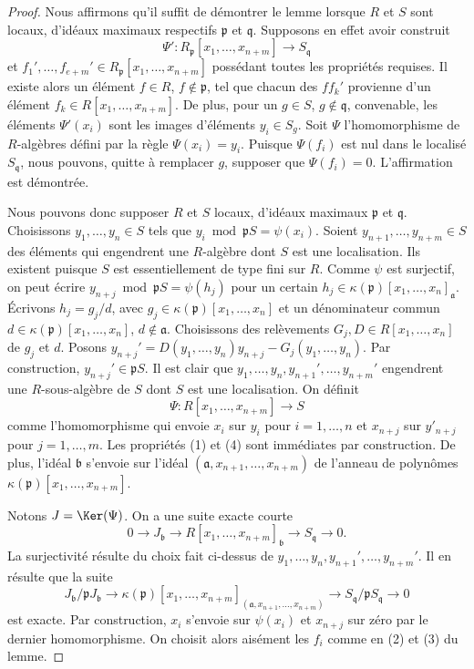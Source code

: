 \begin{proof}
Nous affirmons qu'il suffit de démontrer le lemme lorsque $R$
et $S$ sont locaux, d'idéaux maximaux respectifs $\mathfrak p$ et $\mathfrak q$.
Supposons en effet avoir construit
$$
\Psi' : R_{\mathfrak p}[x_1, \ldots, x_{n + m}]
\longrightarrow
S_{\mathfrak q}
$$
et $f_1', \ldots, f_{e + m}' \in R_{\mathfrak p}[x_1, \ldots, x_{n + m}]$
possédant toutes les propriétés requises. Il existe alors un élément
$f \in R$, $f \not \in \mathfrak p$, tel que chacun des
$ff_k'$ provienne d'un élément $f_k \in R[x_1, \ldots, x_{n + m}]$.
De plus, pour un $g \in S$, $g \not \in \mathfrak q$, convenable,
les éléments $\Psi'(x_i)$ sont les images d'éléments
$y_i \in S_g$. Soit $\Psi$ l'homomorphisme de $R$-algèbres défini
par la règle $\Psi(x_i) = y_i$. Puisque $\Psi(f_i)$ est nul
dans le localisé $S_{\mathfrak q}$, nous pouvons, quitte à remplacer
$g$, supposer que $\Psi(f_i) = 0$. L'affirmation est démontrée.

\medskip\noindent
Nous pouvons donc supposer $R$ et $S$ locaux,
d'idéaux maximaux $\mathfrak p$ et $\mathfrak q$.
Choisissons $y_1, \ldots, y_n \in S$ tels que
$y_i \bmod \mathfrak pS = \psi(x_i)$.
Soient $y_{n + 1}, \ldots, y_{n + m} \in S$ des éléments qui engendrent
une $R$-algèbre dont $S$ est une localisation.
Ils existent puisque $S$ est essentiellement de type fini sur $R$.
Comme $\psi$ est surjectif, on peut écrire
$y_{n + j} \bmod \mathfrak pS = \psi(h_j)$ pour
un certain $h_j \in \kappa(\mathfrak p)[x_1, \ldots, x_n]_{\mathfrak a}$.
Écrivons $h_j = g_j/d$, avec $g_j \in \kappa(\mathfrak p)[x_1, \ldots, x_n]$
et un dénominateur commun $d \in \kappa(\mathfrak p)[x_1, \ldots, x_n]$,
$d \not \in \mathfrak a$. Choisissons des relèvements
$G_j, D \in R[x_1, \ldots, x_n]$ de $g_j$ et $d$. Posons
$y_{n + j}' = D(y_1, \ldots, y_n) y_{n + j} - G_j(y_1, \ldots, y_n)$.
Par construction, $y_{n + j}' \in \mathfrak p S$.
Il est clair que $y_1, \ldots, y_n, y_{n + 1}', \ldots, y_{n + m}'$
engendrent une $R$-sous-algèbre de $S$ dont $S$ est une localisation.
On définit
$$
\Psi : R[x_1, \ldots, x_{n + m}] \to S
$$
comme l'homomorphisme qui envoie $x_i$ sur $y_i$ pour $i = 1, \ldots, n$
et $x_{n + j}$ sur $y'_{n + j}$ pour $j = 1, \ldots, m$. Les propriétés
(1) et (4) sont immédiates par construction. De plus, l'idéal
$\mathfrak b$ s'envoie sur l'idéal
$(\mathfrak a, x_{n + 1}, \ldots, x_{n + m})$
de l'anneau de polynômes $\kappa(\mathfrak p)[x_1, \ldots, x_{n + m}]$.

\medskip\noindent
Notons $J = \Ker(\Psi)$. On a une suite exacte courte
$$
0 \to J_{\mathfrak b}
\to R[x_1, \ldots, x_{n + m}]_{\mathfrak b}
\to S_{\mathfrak q}
\to 0.
$$
La surjectivité résulte du choix fait ci-dessus de
$y_1, \ldots, y_n, y_{n + 1}', \ldots, y_{n + m}'$.
Il en résulte que la suite
$$
J_{\mathfrak b}/ \mathfrak pJ_{\mathfrak b}
\to \kappa(\mathfrak p)[x_1, \ldots, x_{n + m}]_{
(\mathfrak a, x_{n + 1}, \ldots, x_{n + m})}
\to S_{\mathfrak q}/\mathfrak pS_{\mathfrak q}
\to 0
$$
est exacte. Par construction, $x_i$ s'envoie sur $\psi(x_i)$ et
$x_{n + j}$ sur zéro par le dernier homomorphisme.
On choisit alors aisément les $f_i$ comme en
(2) et (3) du lemme.
\end{proof}

